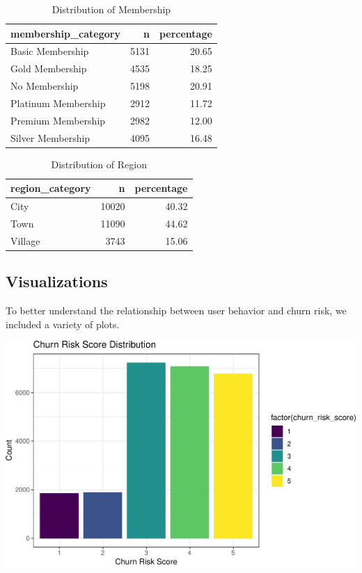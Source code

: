 \documentclass[
  letterpaper,
  DIV=11,
  numbers=noendperiod]{scrartcl}
\begin{document}
\begin{table}[!h]

\caption{Distribution of Membership}
\centering
\fontsize{10}{12}\selectfont
\begin{tabular}[t]{lrr}
\toprule
membership\_category & n & percentage\\
\midrule
Basic Membership & 5131 & 20.65\\
Gold Membership & 4535 & 18.25\\
No Membership & 5198 & 20.91\\
Platinum Membership & 2912 & 11.72\\
Premium Membership & 2982 & 12.00\\
\addlinespace
Silver Membership & 4095 & 16.48\\
\bottomrule
\end{tabular}
\end{table}

\begin{table}[!h]

\caption{Distribution of Region}
\centering
\fontsize{10}{12}\selectfont
\begin{tabular}[t]{lrr}
\toprule
region\_category & n & percentage\\
\midrule
City & 10020 & 40.32\\
Town & 11090 & 44.62\\
Village & 3743 & 15.06\\
\bottomrule
\end{tabular}
\end{table}

\subsection{Visualizations}\label{visualizations}

To better understand the relationship between user behavior and churn
risk, we included a variety of plots.

\begin{center}
\includegraphics{FPCP4_files/figure-pdf/unnamed-chunk-20-1.pdf}
\end{center}
\end{document}
